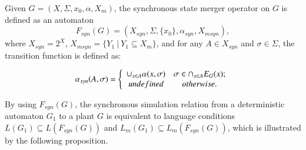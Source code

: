 \documentclass[preprint,authoryear,12pt]{elsarticle}
\begin{document}
\begin{Definition}
Given $G=(X, \Sigma, x_{0}, \alpha, X_{m})$, the synchronous state
merger operator on $G$ is defined as an automaton
\[
F_{syn}(G) = (X_{syn},\Sigma, \{x_{0}\},\alpha_{syn},X_{msyn}),
\]
where $X_{syn} = 2^{X}$, $X_{msyn}=\{ Y_1 ~|~Y_1 \subseteq X_{m}
\}$, and for any $A \in X_{syn}$ and $\sigma \in \Sigma$, the
transition function is defined as:


\[
\alpha_{syn}(A,\sigma) = \left\{ {\begin{array}{*{20}c}
  \cup_{x \in A} \alpha(x, \sigma) & {\sigma \in \cap_{ x \in A}E_{G}(x) };  \\
   undefined & {otherwise}. \\
\end{array}} \right.
\]
\end{Definition}





By using $F_{syn}(G)$, the synchronous simulation relation from a
deterministic automaton $G_1$ to a plant $G$ is equivalent to
language conditions $L(G_1) \subseteq L(F_{syn}(G))$ and
$L_{m}(G_1) \subseteq L_{m}(F_{syn}(G))$, which is illustrated by
the following proposition.
\end{document}
